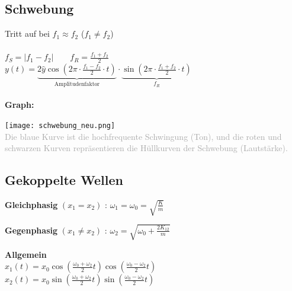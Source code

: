 \documentclass[german]{latex4ei/latex4ei_sheet}
\begin{document}
\begin{sectionbox}
\subsection{Schwebung}
Tritt auf bei $f_1\approx f_2$ ($f_1 \neq f_2$)\\ \\
$f_S=|f_1-f_2| \qquad f_R= \frac{f_1+f_2}{2}$\\
$y(t)=\underbrace{2\hat{y}\cos(2\pi \cdot \frac{f_1-f_2}{2}\cdot t)}_{\text{Amplitudenfaktor}} \cdot \underbrace{\sin(2\pi \cdot \frac{f_1+f_2}{2}\cdot t)}_{f_R} $\\ \\
\textbf{Graph:}\\
\begin{center}
	\texttt{[image: schwebung\_neu.png]}\\
\textcolor{darkgray}{Die blaue Kurve ist die hochfrequente Schwingung (Ton), und die roten und schwarzen Kurven repräsentieren die Hüllkurven der Schwebung (Lautstärke).}
	\end{center}
\end{sectionbox}
\begin{sectionbox}
\subsection{Gekoppelte Wellen}
\begin{cookbox}{}
    \item \textbf{Gleichphasig} $(x_1 = x_2)$ : $\omega_1 = \omega_0 = \sqrt{\frac{K}{m}}$
    
    \item \textbf{Gegenphasig} $(x_1 \neq x_2)$ : $\omega_2 = \sqrt{\omega_0 + \frac{2K_{12}}{m}}$
    
    \item \textbf{Allgemein}\\
    $x_1(t) = x_0 \cos\left( \frac{\omega_0 + \omega_2}{2} t \right) \cos\left( \frac{\omega_0 - \omega_2}{2} t \right)$\\
	$x_2(t) = x_0 \sin\left( \frac{\omega_0 + \omega_2}{2} t \right) \sin\left( \frac{\omega_0 - \omega_2}{2} t \right)$
\end{cookbox}
\end{sectionbox}
\end{document}

